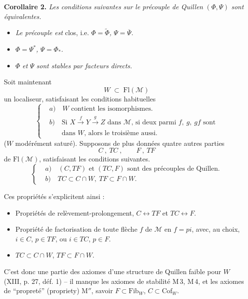 \documentclass[11pt]{article}
\newcommand{\printedpage}[1]{\marginpar{\footnotesize p.~#1}}
\newcommand{\msp}[1]{\marginpar{\footnotesize [#1]}}
\newcommand{\Fl}{\mathrm{Fl}}
\begin{document}
\textbf{Corollaire 2.} \textit{Les conditions suivantes sur le précouple de Quillen} $(\Phi,\Psi)$ \textit{sont équivalentes.}
\begin{itemize}[leftmargin=2.5em]
\item[a)] \textit{Le précouple est} clos, i.e. $\Phi=\widetilde{\Phi}$\textit{,} $\Psi=\overline{\Psi}$\textit{.}
\item[b)] $\Phi=\Psi^*$\textit{,} $\Psi=\Phi_*$\textit{.}
\item[c)] $\Phi$ \textit{et} $\Psi$ \textit{sont stables par facteurs directs.}
\end{itemize}
Soit maintenant
\[
W \;\subset\; \Fl(\mathcal{M})
\tag*{(4.5)}
\]
un localiseur, satisfaisant les conditions habituelles
\[
\left\{
\begin{aligned}
&\textit{a})\quad W \text{ contient les isomorphismes.}\\[1ex]
&\textit{b})\quad \text{Si } X\xrightarrow{\;f\;}Y\xrightarrow{\;g\;}Z \text{ dans } \mathcal{M}\text{, si deux parmi } f,\ g,\ gf \text{ sont}\\
&\phantom{\textit{b})}\quad \text{dans } W\text{, alors le troisième aussi.}
\end{aligned}
\right.
\tag*{(4.6)}
\]
($W$ modérément saturé). Supposons de plus données quatre autres parties
\[
C\ ,\ TC\ , \qquad F\ ,\ TF
\tag*{(4.7)}
\]
de $\Fl(\mathcal{M})$, satisfaisant les conditions suivantes.
\[
\left\{
\begin{aligned}
&\textit{a})\quad (C,TF) \text{ et } (TC,F) \text{ sont des précouples de Quillen.}\\[1ex]
&\textit{b})\quad TC\subset C\cap W,\ TF\subset F\cap W.
\end{aligned}
\right.
\tag*{(4.8)}
\]

\msp{page 32}
Ces propriétés s'explicitent ainsi :
\begin{itemize}[leftmargin=2.5em]
\item[\textbf{M\,1}] Propriétés de relèvement-prolongement, $C\longleftrightarrow TF$ et $TC\longleftrightarrow F$.
\item[\textbf{M\,2}] Propriété de factorisation de toute flèche $f$ de $\mathcal{M}$ en $f=pi$, avec, au choix, $i\in C$, $p\in TF$, ou $i\in TC$, $p\in F$.
\item[\textbf{M$'$}] $TC\subset C\cap W$, $TF\subset F\cap W$.
\end{itemize}

\printedpage{22}
C'est donc une partie des axiomes d'une structure de Quillen faible pour $W$ (XIII, p. 27, déf. 1) -- il manque les axiomes de stabilité M\,3, M\,4, et les axiomes de “propreté” (propriety) M$''$, savoir $F\subset\mathrm{Fib}_W$, $C\subset\mathrm{Cof}_W$.
\end{document}
